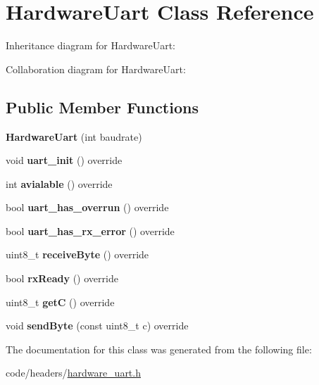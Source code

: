 \hypertarget{classHardwareUart}{}\section{Hardware\+Uart Class Reference}
\label{classHardwareUart}


Inheritance diagram for Hardware\+Uart\+:


Collaboration diagram for Hardware\+Uart\+:
\subsection*{Public Member Functions}
\begin{DoxyCompactItemize}
\item 
\mbox{\label{classHardwareUart_aa5ca3cbeac085c36f9902a6933009615}} 
{\bfseries Hardware\+Uart} (int baudrate)
\item 
\mbox{\label{classHardwareUart_a2425939b2fc43a8ff119687cf878fa05}} 
void {\bfseries uart\+\_\+init} () override
\item 
\mbox{\label{classHardwareUart_a01095dd408b5cf2cd81326887d6dd6cd}} 
int {\bfseries avialable} () override
\item 
\mbox{\label{classHardwareUart_a0cfa72622aa1bd0a2e97a56452f0c552}} 
bool {\bfseries uart\+\_\+has\+\_\+overrun} () override
\item 
\mbox{\label{classHardwareUart_a4a9db0c7a8c3f603cf61c635967673dd}} 
bool {\bfseries uart\+\_\+has\+\_\+rx\+\_\+error} () override
\item 
\mbox{\label{classHardwareUart_ac8adb0c6e412026e0e95a7a940fbe1a9}} 
uint8\+\_\+t {\bfseries receive\+Byte} () override
\item 
\mbox{\label{classHardwareUart_adddb0832d3ada845701a8a5638a2140a}} 
bool {\bfseries rx\+Ready} () override
\item 
\mbox{\label{classHardwareUart_ab746480156eec92af197505681b9fcfc}} 
uint8\+\_\+t {\bfseries getC} () override
\item 
\mbox{\label{classHardwareUart_ae097ce5f33053f11b8c76052b6a20ab6}} 
void {\bfseries send\+Byte} (const uint8\+\_\+t c) override
\end{DoxyCompactItemize}


The documentation for this class was generated from the following file\+:\begin{DoxyCompactItemize}
\item 
code/headers/\hyperlink{hardware__uart_8h}{hardware\+\_\+uart.\+h}\end{DoxyCompactItemize}
